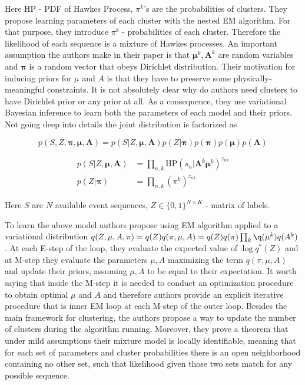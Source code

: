 \documentclass[10pt]{article}
\begin{document}
Here $\text{HP}$ - PDF of Hawkes Process, $\pi^{k}$’s are the probabilities of clusters.
They propose learning parameters of each cluster with the nested EM algorithm. For that purpose, they introduce $\pi^k$ - probabilities of each cluster. Therefore the likelihood of each sequence is a mixture of Hawkes processes. An important assumption the authors make in their paper is that $\mathbf{\mu}^k, \mathbf{A}^k$ are random variables and $\mathbf{\pi}$ is a random vector that obeys Dirichlet distribution. Their motivation for inducing priors for $\mu$ and $A$ is that they have to preserve some physically-meaningful constraints. It is not absolutely clear why do authors need clusters to have Dirichlet prior or any prior at all. As a consequence, they use variational Bayesian inference to learn both the parameters of each model and their priors. Not going deep into details the joint distribution is factorized as

\begin{equation}
p(S, Z, \mathbf{\pi}, \mathbf{\mu}, \mathbf{A}) = p(S|Z, \mathbf{\mu}, \mathbf{A})p(Z|\mathbf{\pi})p(\mathbf{\pi})p(\mathbf{\mu})p(\mathbf{A})
\end{equation}

\begin{align}
p(S|Z, \mathbf{\mu}, \mathbf{A}) &= \prod_{n,k}\text{HP}(s_n|\mathbf{A}^k \mathbf{\mu}^k)^{z_{nk}} 
\\ p(Z|\mathbf{\pi}) &=\prod_{n,k}(\pi^{k})^{z_{nk}}
\end{align}

Here $S$ are $N$ available event sequences, $Z \in \{0, 1\}^{N\times K}$ - matrix of labels. 

To learn the above model authors propose using EM algorithm applied to a variational distribution $q(Z,\mu, A, \pi)=q(Z)q(\pi, \mu, A)=q(Z)q(\pi)\prod_k \q(\mu^k)q(A^k)$ . At each E-step of the loop, they evaluate the expected value of $\log q^*(Z)$ and at M-step they evaluate the parameters $\mu, A$ maximizing the term $q(\pi, \mu, A)$ and update their priors, assuming $\mu, A$ to be equal to their expectation. It worth saying that inside the M-step it is needed to conduct an optimization procedure to obtain optimal $\mu$ and $A$ and therefore authors provide an explicit iterative procedure that is inner EM loop at each M-step of the outer loop. Besides the main framework for clustering, the authors propose a way to update the number of clusters during the algorithm running. Moreover, they prove a theorem that under mild assumptions their mixture model is locally identifiable, meaning that for each set of parameters and cluster probabilities there is an open neighborhood containing no other set, such that likelihood given those two sets match for any possible sequence. 
\end{document}
